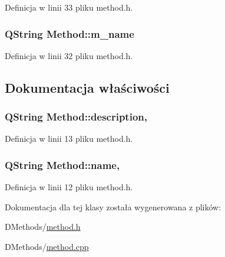 Definicja w linii 33 pliku method.\-h.

\hypertarget{class_method_a9d32898717bfff12b9935ce28466bfbb}{
\subsubsection[{m\-\_\-name}]{\setlength{\rightskip}{0pt plus 5cm}Q\-String Method\-::m\-\_\-name\hspace{0.3cm}{\ttfamily [private]}}}\label{class_method_a9d32898717bfff12b9935ce28466bfbb}


Definicja w linii 32 pliku method.\-h.



\subsection{Dokumentacja właściwości}
\hypertarget{class_method_ab9629abfec31f98ae690c575d48ccfe7}{
\subsubsection[{description}]{\setlength{\rightskip}{0pt plus 5cm}Q\-String Method\-::description\hspace{0.3cm}{\ttfamily [read]}, {\ttfamily [write]}}}\label{class_method_ab9629abfec31f98ae690c575d48ccfe7}


Definicja w linii 13 pliku method.\-h.

\hypertarget{class_method_a9131d3ff2cd50747c50290986126aff3}{
\subsubsection[{name}]{\setlength{\rightskip}{0pt plus 5cm}Q\-String Method\-::name\hspace{0.3cm}{\ttfamily [read]}, {\ttfamily [write]}}}\label{class_method_a9131d3ff2cd50747c50290986126aff3}


Definicja w linii 12 pliku method.\-h.



Dokumentacja dla tej klasy została wygenerowana z plików\-:\begin{DoxyCompactItemize}
\item 
D\-Methods/\hyperlink{method_8h}{method.\-h}\item 
D\-Methods/\hyperlink{method_8cpp}{method.\-cpp}\end{DoxyCompactItemize}
